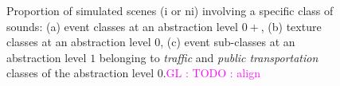 \documentclass[12pt]{elsarticle}
\newcommand{\gl}[1]{\textcolor{magenta}{GL : #1}}
\newcommand{\myfloatalign}{\centering}
\begin{document}
\begin{figure}[!tp]
		\myfloatalign
        \par
       \caption{Proportion of simulated scenes (i or ni) involving a specific class of sounds: (a) event classes at an abstraction level $0+$, (b) texture classes at an abstraction level $0$, (c) event sub-classes at an abstraction level $1$ belonging to \emph{traffic} and \emph{public transportation} classes of the abstraction level $0$.\gl{TODO : align}}\label{fig:soundsource}
\end{figure}
\end{document}
